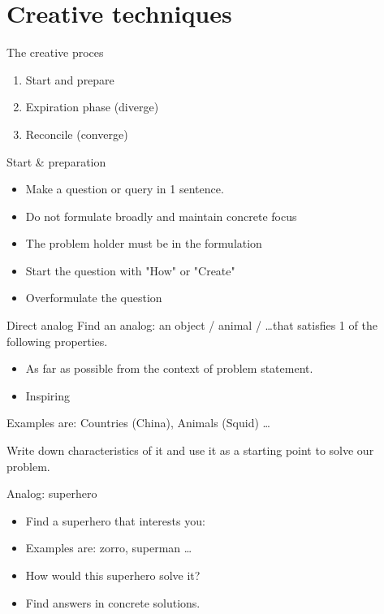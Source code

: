 \documentclass[notes]{beamer}
\begin{document}
\section{Creative techniques}
\sectionframe{}

\begin{frame}{The creative proces}
\begin{enumerate}
	\item Start and prepare
	
	\item Expiration phase (diverge)
	
	\item Reconcile (converge)
\end{enumerate}
\end{frame}

\begin{frame}{Start \& preparation}
	\begin{itemize}
		\item Make a question or query in 1 sentence.
		
		\item Do not formulate broadly and maintain concrete focus
		
		\item The problem holder must be in the formulation
		
		\item Start the question with "How" or "Create"
		
		\item Overformulate the question
	\end{itemize}
\end{frame}

\begin{frame}{Direct analog}
	Find an analog: an object / animal / \dots that satisfies 1 of the following properties.
	\begin{itemize}
			\item As far as possible from the context of problem statement.
		\item Inspiring
		
	\end{itemize}

	
	Examples are: Countries (China), Animals (Squid) \dots
	
	Write down characteristics of it and use it as a starting point to solve our problem.
\end{frame}

\begin{frame}{Analog: superhero}
	\begin{itemize}
		\item Find a superhero that interests you:
		
		\item Examples are: zorro, superman \dots
		
		\item How would this superhero solve it?
		
		\item Find answers in concrete solutions.
	\end{itemize}
\end{frame}
\end{document}
